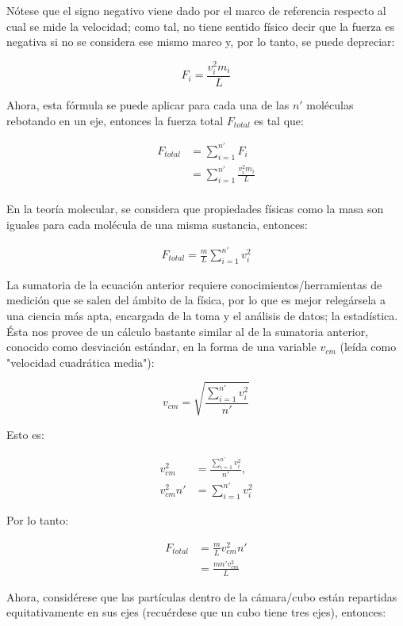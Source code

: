 \documentclass{article}
\begin{document}
Nótese que el signo negativo viene dado por el marco
de referencia respecto al cual se mide la velocidad;
como tal, no tiene sentido físico decir que la
fuerza es negativa si no se considera ese mismo
marco y, por lo tanto, se puede depreciar:

\[
    F_i = \frac{v^2_i m_i}{L}
\]

Ahora, esta fórmula se puede aplicar para cada una
de las \(n'\) moléculas rebotando en un eje, entonces
la fuerza total \(F_{total}\) es tal que:

\begin{align*}
    F_{total} & = \sum_{i = 1}^{n'}  F_i                \\
              & = \sum_{i = 1}^{n'} \frac{v^2_i m_i}{L} \\
\end{align*}

En la teoría molecular, se considera que propiedades 
físicas como la masa son iguales para cada molécula 
de una misma sustancia, entonces:

\begin{align*}
    F_{total} = \frac{m}{L} \sum_{i = 1}^{n'} v^2_i
\end{align*}

La sumatoria de la ecuación anterior requiere 
conocimientos/herramientas de medición que se salen
del ámbito de la física, por lo que es mejor 
relegársela a una ciencia más apta, encargada de 
la toma y el análisis de datos; la estadística. Ésta
nos provee de un cálculo bastante similar al de 
la sumatoria anterior, conocido como desviación 
estándar, en la forma de una variable \(v_{cm}\)
(leída como "velocidad cuadrática media"):

\[
    v_{cm} = \sqrt{\frac{\sum_{i = 1}^{n'} v_i^2}{n'}}
\]

Esto es:

\begin{align*}
    v_{cm}^2    &= \frac{\sum_{i = 1}^{n'} v_i^2 }{n'},\\
    v_{cm}^2 n' &= \sum_{i = 1}^{n'} v_i^2
\end{align*}

Por lo tanto:

\begin{align*}
    F_{total}   &= \frac{m}{L} v_{cm}^2 n' \\
                &= \frac{m n' v_{cm}^2}{L}
\end{align*}

Ahora, considérese que las partículas dentro de la 
cámara/cubo están repartidas equitativamente en sus 
ejes (recuérdese que un cubo tiene tres ejes), entonces:
\end{document}
